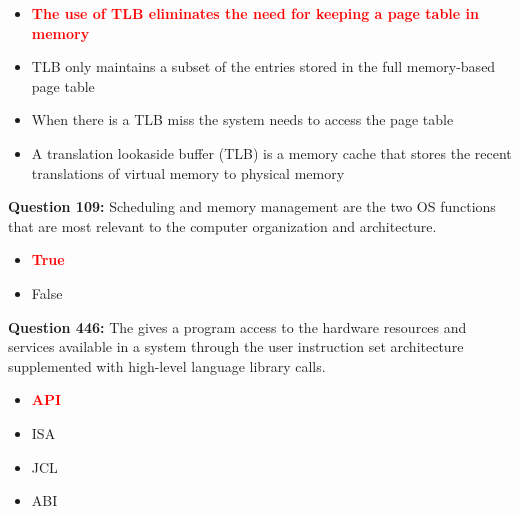\documentclass[12pt,a4paper]{article}
\begin{document}
\begin{itemize}
    \item[\textbf{A.}] \textcolor{red}{\textbf{The use of TLB eliminates the need for keeping a page table in memory}}
    \item[\textbf{B.}] TLB only maintains a subset of the entries stored in the full memory-based page table
    \item[\textbf{C.}] When there is a TLB miss the system needs to access the page table
    \item[\textbf{D.}] A translation lookaside buffer (TLB) is a memory cache that stores the recent translations of virtual memory to physical memory
\end{itemize}

\vspace{0.5cm}

\vspace{0.5cm}

\textbf{Question 109:} Scheduling and memory management are the two OS functions that are most relevant to the computer organization and architecture.

\begin{itemize}
    \item[\textbf{A.}] \textcolor{red}{\textbf{True}}
    \item[\textbf{B.}] False
\end{itemize}

\vspace{0.5cm}

\vspace{0.5cm}

\textbf{Question 446:} The \underline{\hspace{1.5cm}} gives a program access to the hardware resources and services available in a system through the user instruction set architecture supplemented with high-level language library calls.

\begin{itemize}
    \item[\textbf{A.}] \textcolor{red}{\textbf{API}}
    \item[\textbf{B.}] ISA
    \item[\textbf{C.}] JCL
    \item[\textbf{D.}] ABI
\end{itemize}

\vspace{0.5cm}

\vspace{0.5cm}
\end{document}
